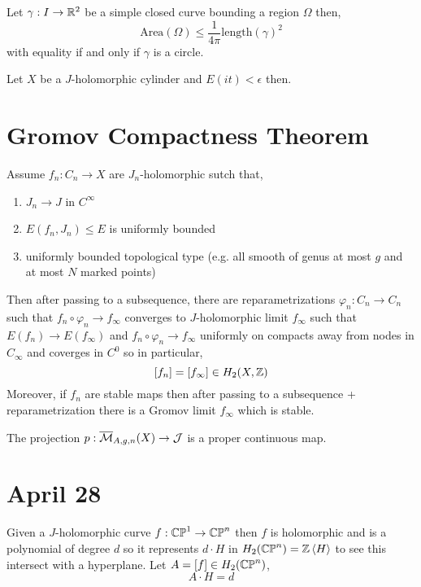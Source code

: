 \documentclass[12pt]{article}
\begin{document}
\begin{thm}
Let $\gamma : I \to \mathbb{R}^2$ be a simple closed curve bounding a region $\Omega$ then,
\[ \mathrm{Area}(\Omega) \le \frac{1}{4 \pi} \mathrm{length}(\gamma)^2 \]
with equality if and only if $\gamma$ is a circle.
\end{thm}

\begin{thm}
Let $X$ be a $J$-holomorphic cylinder and $E(it) < \epsilon$ then.
\end{thm}

\section{Gromov Compactness Theorem}

Assume $f_n : C_n \to X$ are $J_n$-holomorphic sutch that,
\begin{enumerate}
\item $J_n \to J$ in $C^\infty$
\item $E(f_n, J_n) \le E$ is uniformly bounded
\item uniformly bounded topological type (e.g. all smooth of genus at most $g$ and at most $N$ marked points)
\end{enumerate}

Then after passing to a subsequence, there are reparametrizations $\varphi_n : C_n \to C_n$ such that $f_n \circ \varphi_n \to f_\infty$ converges to $J$-holomorphic limit $f_\infty$ such that $E(f_n) \to E(f_\infty)$ and $f_n \circ \varphi_n \to f_\infty$ uniformly on compacts away from nodes in $C_\infty$ and coverges in $C^0$ so in particular,
\[ [f_n] = [f_\infty] \in H_2(X, \mathbb{Z}) \]
Moreover, if $f_n$ are stable maps then after passing to a subsequence + reparametrization there is a Gromov limit $f_\infty$ which is stable.

\begin{cor}
The projection $p : \overline{\mathcal{M}}_{A, g, n}(X) \to \mathcal{J}$ is a proper continuous map.
\end{cor}

\section{April 28}

Given a $J$-holomorphic curve $f : \mathbb{CP}^1 \to \mathbb{CP}^n$ then $f$ is holomorphic and is a polynomial of degree $d$ so it represents $d \cdot H$ in $H_2(\mathbb{CP}^n) = \mathbb{Z} \left< H \right>$ to see this intersect with a hyperplane. Let $A = [f] \in H_2(\mathbb{CP}^n)$,
\[ A \cdot H = d \]
\end{document}

